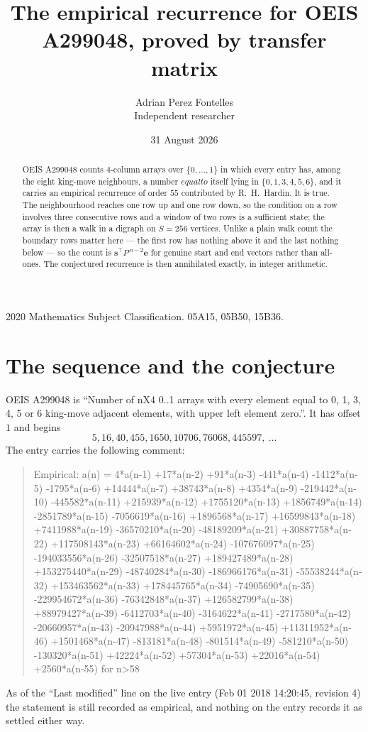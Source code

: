 \documentclass[11pt,a4paper]{article}
\title{The empirical recurrence for OEIS A299048, proved by transfer matrix}
\author{Adrian Perez Fontelles\\ \small Independent researcher}
\date{31 August 2026}
\theoremstyle{plain}
\theoremstyle{definition}
\begin{document}
\maketitle

\begin{abstract}
OEIS A299048 counts $4$-column arrays over $\{0,\dots,1\}$ in which every entry has,
among the eight king-move neighbours, a number $equal to$ itself lying in $\{0,1,3,4,5,6\}$, and it carries an empirical
recurrence of order $55$ contributed by R.~H.~Hardin. It is true. The neighbourhood
reaches one row up and one row down, so the condition on a row involves three consecutive
rows and a window of two rows is a sufficient state; the array is then a walk in a digraph
on $S=256$ vertices. Unlike a plain walk count the boundary rows matter here --- the first
row has nothing above it and the last nothing below --- so the count is
$\mathbf{s}^{\!\top}P^{\,n-2}\mathbf{e}$ for genuine start and end vectors rather than
all-ones. The conjectured recurrence is then annihilated exactly, in integer arithmetic.
\end{abstract}

\noindent\small 2020 Mathematics Subject Classification. 05A15, 05B50, 15B36.\normalsize

\section{The sequence and the conjecture}

OEIS A299048 is ``Number of nX4 0..1 arrays with every element equal to 0, 1, 3, 4, 5 or 6 king-move adjacent elements, with upper left element zero.''. It has offset
$1$ and begins
\[
5, 16, 40, 455, 1650, 10706, 76068, 445597,\ \dots
\]
The entry carries the following comment:
\begin{quote}\small
Empirical: a(n) = 4*a(n-1) +17*a(n-2) +91*a(n-3) -441*a(n-4) -1412*a(n-5) -1795*a(n-6) +14444*a(n-7) +38743*a(n-8) +4354*a(n-9) -219442*a(n-10) -445582*a(n-11) +215939*a(n-12) +1755120*a(n-13) +1856749*a(n-14) -2851789*a(n-15) -7056619*a(n-16) +1896568*a(n-17) +16599843*a(n-18) +7411988*a(n-19) -36570210*a(n-20) -48189209*a(n-21) +30887758*a(n-22) +117508143*a(n-23) +66164602*a(n-24) -107676097*a(n-25) -194033556*a(n-26) -32507518*a(n-27) +189427489*a(n-28) +153275440*a(n-29) -48740284*a(n-30) -186966176*a(n-31) -55538244*a(n-32) +153463562*a(n-33) +178445765*a(n-34) -74905690*a(n-35) -229954672*a(n-36) -76342848*a(n-37) +126582799*a(n-38) +88979427*a(n-39) -6412703*a(n-40) -3164622*a(n-41) -2717580*a(n-42) -20660957*a(n-43) -20947988*a(n-44) +5951972*a(n-45) +11311952*a(n-46) +1501468*a(n-47) -813181*a(n-48) -801514*a(n-49) -581210*a(n-50) -130320*a(n-51) +42224*a(n-52) +57304*a(n-53) +22016*a(n-54) +2560*a(n-55) for n>58
\end{quote}
As of the ``Last modified'' line on the live entry (Feb 01 2018 14:20:45, revision
4) the statement is still recorded as empirical, and nothing on the entry
records it as settled either way.
\end{document}

